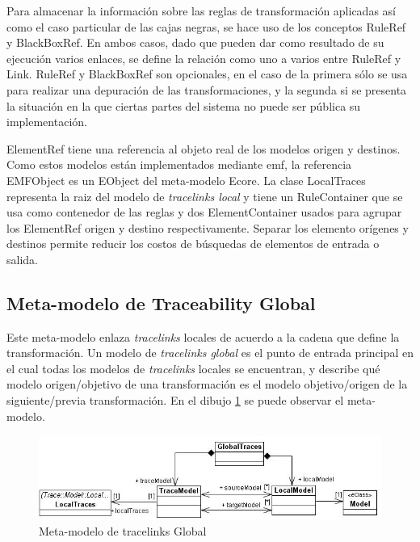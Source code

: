 \documentclass[a4paper,12pt,oneside,spanish]{book}
\begin{document}
Para almacenar la información sobre las reglas de transformación aplicadas así como el caso particular de las cajas negras, se hace uso de los conceptos \textsf{RuleRef} y \textsf{BlackBoxRef}. En ambos casos, dado que pueden dar como resultado de su ejecución varios enlaces, se define la relación como uno a varios entre \textsf{RuleRef} y \textsf{Link}. \textsf{RuleRef} y \textsf{BlackBoxRef} son opcionales, en el caso de la primera sólo se usa para realizar una depuración de las transformaciones, y la segunda si se presenta la situación en la que ciertas partes del sistema no puede ser pública su implementación.

\textsf{ElementRef} tiene una referencia al objeto real de los modelos origen y destinos. Como estos modelos están implementados mediante \gls{emf}, la referencia \textsf{EMFObject} es un \textsf{EObject} del meta-modelo \textsf{Ecore}. La clase \textsf{LocalTraces} representa la raiz del modelo de \textit{tracelinks local} y tiene un \textsf{RuleContainer} que se usa como contenedor de las reglas y dos \textsf{ElementContainer} usados para agrupar los \textsf{ElementRef} origen y destino respectivamente. Separar los elemento orígenes y destinos permite reducir los costos de búsquedas de elementos de entrada o salida.

\subsection{Meta-modelo de Traceability Global}
\label{subsec:TraceabilityGlobal}

Este meta-modelo enlaza \textit{tracelinks} locales de acuerdo a la cadena que define la transformación. Un modelo de \textit{tracelinks global} es el punto de entrada principal en el cual todas los modelos de \textit{tracelinks} locales se encuentran, y describe qué modelo origen/objetivo de una transformación es el modelo objetivo/origen de la siguiente/previa transformación. En el dibujo \ref{fig:GlobalTraceMetamodel} se puede observar el meta-modelo.

\begin{figure}[hbtp]
\centering
\includegraphics[scale=.62]{./img/GlobalTraceMetamodel}
\caption{Meta-modelo de tracelinks Global}
\label{fig:GlobalTraceMetamodel}
\end{figure}
\end{document}
